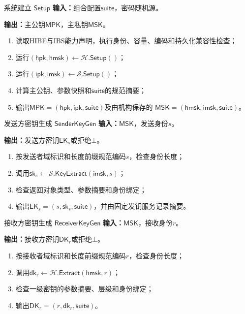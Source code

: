 \begin{ibmealgorithm}{系统建立 $\mathsf{Setup}$}
\label{alg:setup}
\textbf{输入：}组合配置$\mathsf{suite}$，密码随机源。\par
\textbf{输出：}主公钥$\mathsf{MPK}$，主私钥$\mathsf{MSK}$。
\begin{enumerate}
  \item 读取HIBE与IBS能力声明，执行身份、容量、编码和持久化兼容性检查；
  \item 运行$(\mathsf{hpk},\mathsf{hmsk})\leftarrow\mathcal H.\mathsf{Setup}()$；
  \item 运行$(\mathsf{ipk},\mathsf{imsk})\leftarrow\mathcal S.\mathsf{Setup}()$；
  \item 计算主公钥、参数快照和$\mathsf{suite}$的规范摘要；
  \item 输出$\mathsf{MPK}=(\mathsf{hpk},\mathsf{ipk},\mathsf{suite})$及由机构保存的
        $\mathsf{MSK}=(\mathsf{hmsk},\mathsf{imsk},\mathsf{suite})$。
\end{enumerate}
\end{ibmealgorithm}

\begin{ibmealgorithm}{发送方密钥生成 $\mathsf{SenderKeyGen}$}
\label{alg:sender-keygen}
\textbf{输入：}$\mathsf{MSK}$，发送身份$s$。\par
\textbf{输出：}发送方密钥$\mathsf{EK}_s$或拒绝$\bot$。
\begin{enumerate}
  \item 按发送者域标识和长度前缀规范编码$s$，检查身份长度；
  \item 调用$\mathsf{sk}_s\leftarrow\mathcal S.\mathsf{KeyExtract}(\mathsf{imsk},s)$；
  \item 检查返回对象类型、参数摘要和身份绑定；
  \item 输出$\mathsf{EK}_s=(s,\mathsf{sk}_s,\mathsf{suite})$，并由固定发钥服务记录摘要。
\end{enumerate}
\end{ibmealgorithm}

\begin{ibmealgorithm}{接收方密钥生成 $\mathsf{ReceiverKeyGen}$}
\label{alg:receiver-keygen}
\textbf{输入：}$\mathsf{MSK}$，接收身份$r$。\par
\textbf{输出：}接收方密钥$\mathsf{DK}_r$或拒绝$\bot$。
\begin{enumerate}
  \item 按接收者域标识和长度前缀规范编码$r$，检查身份长度；
  \item 调用$\mathsf{dk}_r\leftarrow\mathcal H.\mathsf{Extract}(\mathsf{hmsk},r)$；
  \item 检查一级密钥的参数摘要、层级和身份绑定；
  \item 输出$\mathsf{DK}_r=(r,\mathsf{dk}_r,\mathsf{suite})$。
\end{enumerate}
\end{ibmealgorithm}

